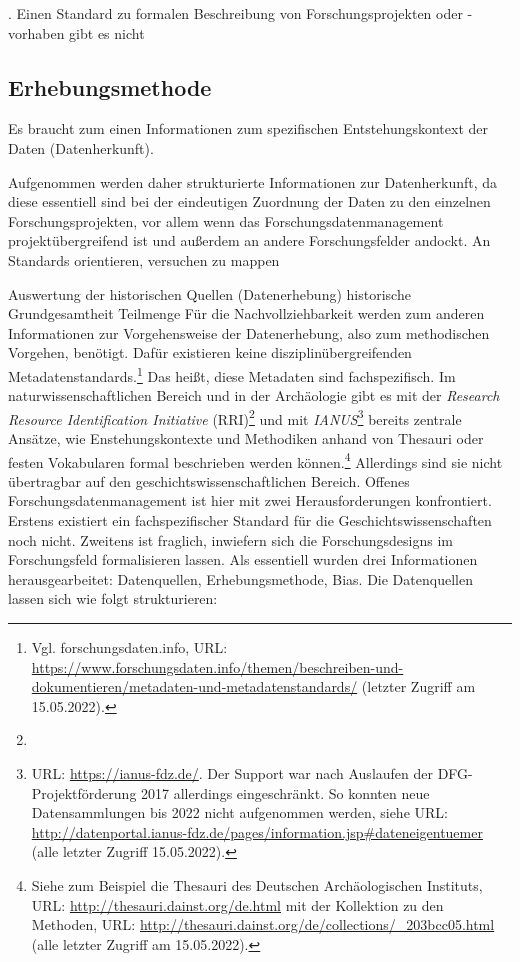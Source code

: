 . Einen Standard zu formalen Beschreibung von Forschungsprojekten oder -vorhaben gibt es nicht  





\subsection{Erhebungsmethode}



Es braucht zum einen Informationen zum spezifischen Entstehungskontext der Daten (Datenherkunft). 

Aufgenommen werden daher strukturierte Informationen zur Datenherkunft, da diese essentiell sind bei der eindeutigen Zuordnung der Daten zu den einzelnen Forschungsprojekten, vor allem wenn das Forschungsdatenmanagement projektübergreifend ist und außerdem an andere Forschungsfelder andockt. An Standards orientieren, versuchen zu mappen


Auswertung der historischen Quellen (Datenerhebung)
historische Grundgesamtheit Teilmenge
Für die Nachvollziehbarkeit werden zum anderen Informationen zur Vorgehensweise der Datenerhebung, also zum methodischen Vorgehen, benötigt. Dafür existieren keine disziplinübergreifenden Metadatenstandards.\footnote{Vgl. forschungsdaten.info, URL: \url{https://www.forschungsdaten.info/themen/beschreiben-und-dokumentieren/metadaten-und-metadatenstandards/} (letzter Zugriff am 15.05.2022).} Das heißt, diese Metadaten sind fachspezifisch. Im naturwissenschaftlichen Bereich und in der Archäologie gibt es mit der \textit{Research Resource Identification Initiative} (RRI)\footnote{} und mit \textit{IANUS}\footnote{URL: \url{https://ianus-fdz.de/}. Der Support war nach Auslaufen der DFG-Projektförderung 2017 allerdings eingeschränkt. So konnten neue Datensammlungen bis 2022 nicht aufgenommen werden, siehe URL: \url{http://datenportal.ianus-fdz.de/pages/information.jsp\#dateneigentuemer} (alle letzter Zugriff 15.05.2022).} bereits zentrale Ansätze, wie Enstehungskontexte und Methodiken anhand von Thesauri oder festen Vokabularen formal beschrieben werden können.\footnote{Siehe zum Beispiel die Thesauri des Deutschen Archäologischen Instituts, URL: \url{http://thesauri.dainst.org/de.html} mit der Kollektion zu den Methoden, URL: \url{http://thesauri.dainst.org/de/collections/\_203bcc05.html} (alle letzter Zugriff am 15.05.2022).} Allerdings sind sie nicht übertragbar auf den geschichtswissenschaftlichen Bereich. Offenes Forschungsdatenmanagement ist hier mit zwei Herausforderungen konfrontiert. Erstens existiert ein fachspezifischer Standard für die Geschichtswissenschaften noch nicht. Zweitens ist fraglich, inwiefern sich die Forschungsdesigns im Forschungsfeld formalisieren lassen. Als essentiell wurden drei Informationen herausgearbeitet: Datenquellen, Erhebungsmethode, Bias. Die Datenquellen lassen sich wie folgt strukturieren:

